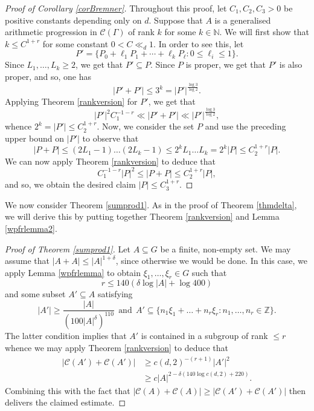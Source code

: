 \documentclass[12pt, reqno]{amsart}
\theoremstyle{remark}
\theoremstyle{definition}
\numberwithin{equation}{section}
\begin{document}
\begin{proof}[Proof of Corollary \ref{corBremner}]
Throughout this proof, let $C_1, C_2, C_3>0$ be positive constants depending only on $d$. Suppose that $A$ is a generalised arithmetic progression in $\mathcal{C}(\Gamma)$ of rank $k$ for some $k \in \mathbb{N}$. We will first show that $k \leq C^{1 + r}$ for some constant $0 < C \ll_d 1$. In order to see this, let 
\begin{equation} \label{hypercube}
P' = \{P_0 + \ell_1P_1 + \cdots +\ell_kP_\ell  :  0\leq \ell_i \leq 1\} . \end{equation}
Since $L_1, \dots, L_k \geq 2$, we get that $P' \subseteq P$. Since $P$ is proper, we get that $P'$ is also proper, and so, one has
\[ |P'+P'| \leq 3^k = |P'|^{\frac{\log 3}{\log 2}}. \]
Applying Theorem \ref{rankversion} for $P'$, we get that
\[ |P'|^2 C_1^{-1 -r} \ll |P'+P'| \ll |P'|^{\frac{\log 3}{\log 2}},\]
whence $2^k = |P'| \leq C_2^{1 + r}$. Now, we consider the set $P$ and use the preceding upper bound on $|P'|$ to observe that
\[ |P+P| \leq (2L_1-1) \dots (2L_k - 1) \leq 2^k L_1 \dots L_k = 2^k |P| \leq C_2^{1 + r}|P|. \]
 We can now apply Theorem \ref{rankversion} to deduce that 
    $$C_1^{-1 - r}|P|^2 \leq  |P+P| \leq C_2^{1 + r}|P|, $$
and so, we obtain the desired claim $|P| \leq C_3^{1 + r}$.
\end{proof}



We now consider Theorem \ref{sumprod1}. As in the proof of Theorem \ref{thmdelta}, we will derive this by putting together Theorem \ref{rankversion} and Lemma \ref{wpfrlemma2}.

\begin{proof}[Proof of Theorem \ref{sumprod1}]
    Let $A \subseteq G$ be a finite, non-empty set. We may assume that $|A+A| \leq |A|^{1 + \delta}$, since otherwise we would be done. In this case, we apply Lemma \ref{wpfrlemma} to obtain $\xi_1, \dots, \xi_r \in G$ such that 
    \[ r \leq 140( \delta \log|A| + \log 400) \]
    and some subset $A' \subseteq A$ satisfying
    \[ |A'| \geq  \frac{|A|}{(100 |A|^{\delta})^{110}} \ \ \text{and} \ \ A' \subseteq \{ n_1 \xi_1 + \dots + n_r \xi_r : n_1, \dots, n_r \in \mathbb{Z} \}. \]
    The latter condition implies that $A'$ is contained in a subgroup of rank $\leq r$ whence we may apply Theorem \ref{rankversion} to deduce that
    \begin{align*}
        |\mathcal{C}(A') + \mathcal{C}(A')| &  \geq c(d,2)^{ -(r+1)} |A'|^2 \\
        & \geq c |A|^{2-\delta(140  \log c(d,2) + 220)}.
     \end{align*}
    Combining this with the fact that $|\mathcal{C}(A) + \mathcal{C}(A)| \geq |\mathcal{C}(A') + \mathcal{C}(A')|$ then delivers the claimed estimate.
\end{proof}
\end{document}
